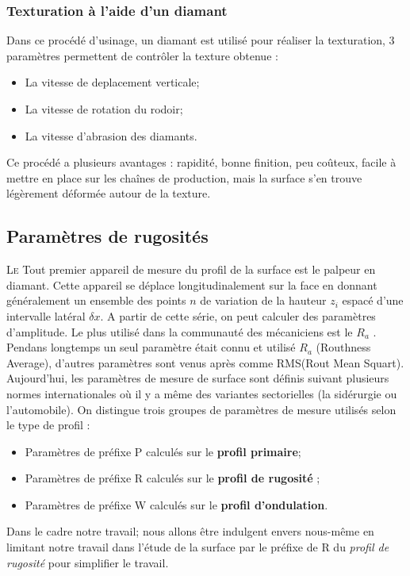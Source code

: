 \subsubsection{Texturation à l'aide d'un diamant}
Dans ce procédé d’usinage, un diamant est utilisé pour réaliser la texturation, 3 paramètres permettent de contrôler la texture obtenue :
\begin{itemize}	
	\item La vitesse de deplacement verticale;
	\item La vitesse de rotation du rodoir;
	\item La vitesse d'abrasion des diamants.
\end{itemize}
Ce procédé a plusieurs avantages : rapidité, bonne finition, peu coûteux, facile à mettre en place sur les chaînes de production, mais la surface s’en trouve légèrement déformée autour de la texture.

\subsection{Paramètres de rugosités}
\lettrine{L}{e} Tout premier appareil de mesure du profil de la surface est le palpeur en diamant. Cette appareil se déplace longitudinalement sur la face en donnant généralement un ensemble des points $n$ de variation de la hauteur $z_i$ espacé d'une intervalle latéral $\delta x$. A partir de cette série, on peut calculer des paramètres d’amplitude. Le plus utilisé dans la communauté des mécaniciens est le $R_a$ \cite{initiation}. Pendans longtemps un seul paramètre était connu et utilisé $R_a$ (Routhness Average), d'autres paramètres sont venus après comme RMS(Rout Mean Squart). Aujourd'hui, les paramètres de mesure de surface sont définis suivant plusieurs normes internationales où il y a même des variantes sectorielles (la sidérurgie ou l'automobile). On distingue trois groupes de paramètres de mesure utilisés selon le type de profil \cite{ayad1}:
\begin{itemize}
	\item Paramètres de préfixe P calculés sur le \textbf{profil primaire};
	\item Paramètres de préfixe R calculés sur le \textbf{profil de rugosité} ;
	\item Paramètres de préfixe W calculés sur le \textbf{profil d'ondulation}.
\end{itemize}
Dans le cadre notre travail; nous allons être indulgent envers nous-même en limitant notre travail dans l'étude de la surface  par le préfixe de R du \emph{profil de rugosité} pour simplifier le travail.\\

